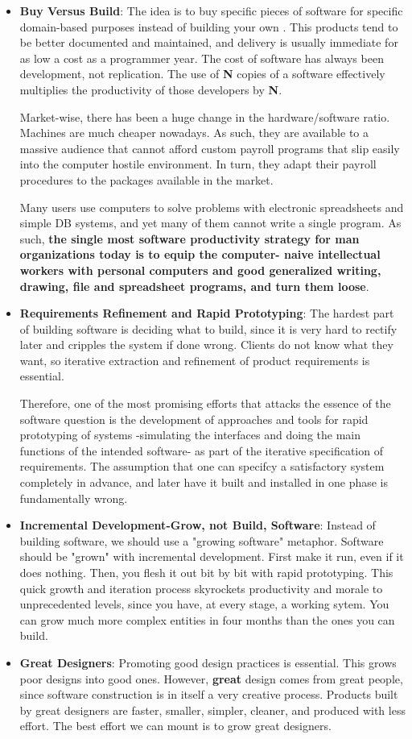 \documentclass[letterpaper,12pt,parskip=full]{article}
\begin{document}
\begin{itemize}
    \item \textbf{Buy Versus Build}: The idea is to buy specific pieces of software for specific domain-based purposes instead of building your own . This products tend to be better documented and maintained, and delivery is usually immediate for as low a cost as a programmer year. The cost of software has always been development, not replication. The use of \textbf{N} copies of a software effectively multiplies the productivity of those developers by \textbf{N}. 
    
    Market-wise, there has been a huge change in the hardware/software ratio. Machines are much cheaper nowadays. As such, they are available to a massive audience that cannot afford custom payroll programs that slip easily into the computer hostile environment. In turn, they adapt their payroll procedures to the packages available in the market.
    
    Many users use computers to solve problems with electronic spreadsheets and simple DB systems, and yet many of them cannot write a single program. As such, \textbf{the single most software productivity strategy for man organizations today is to equip the computer- naive intellectual workers with personal computers and good generalized writing, drawing, file and spreadsheet programs, and turn them loose}.
    \item \textbf{Requirements Refinement and Rapid Prototyping}: The hardest part of building software is deciding what to build, since it is very hard to rectify later and cripples the system if done wrong. Clients do not know what they want, so iterative extraction and refinement of product requirements is essential.
    
    Therefore, one of the most promising efforts that attacks the essence of the software question is the development of approaches and tools for rapid prototyping of systems -simulating the interfaces and doing the main functions of the intended software- as part of the iterative specification of requirements. The assumption that one can specifcy a satisfactory system completely in advance, and later have it built and installed in one phase is fundamentally wrong.
    \item \textbf{Incremental Development-Grow, not Build, Software}: Instead of building software, we should use a "growing software" metaphor. Software should be "grown" with incremental development. First make it run, even if it does nothing. Then, you flesh it out bit by bit with rapid prototyping. This quick growth and iteration process skyrockets productivity and morale to unprecedented levels, since you have, at every stage, a working sytem. You can grow much more complex entities in four months than the ones you can build.
    \item \textbf{Great Designers}: Promoting good design practices is essential. This grows poor designs into good ones. However, \textbf{great} design comes from great people, since software construction is in itself a very creative process. Products built by great designers are faster, smaller, simpler, cleaner, and produced with less effort. The best effort we can mount is to grow great designers.
    

\end{itemize}
\end{document}
